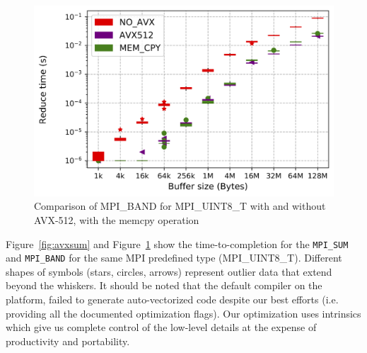 \documentclass[5p,times,twocolumn]{elsarticle}
\newcommand{\mpifunc}[1]{\lstinline"MPI_#1"\xspace}
\begin{document}
\begin{figure}[h]
    \centering
    \includegraphics[width=\linewidth]{avx_extend_more_prod_u8_1k-128M.png}
    \caption{Comparison of MPI\_BAND for MPI\_UINT8\_T with and without AVX-512, with the memcpy operation}
    \label{fig:avxband}
\end{figure}

Figure~\ref{fig:avxsum} and Figure~\ref{fig:avxband} show the time-to-completion for the
\mpifunc{SUM} and \mpifunc{BAND} for the same MPI predefined type (MPI\_UINT8\_T). Different shapes of symbols (stars, circles,
arrows) represent outlier data that extend beyond the whiskers.
It should be noted that the default compiler on the platform, failed to
generate auto-vectorized code despite our best efforts (i.e.
providing all the documented optimization flags). Our optimization uses intrinsics which give us complete
control of the low-level details at the expense of productivity and
portability.
\end{document}

